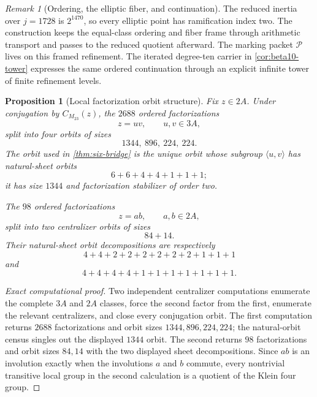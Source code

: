 \documentclass[11pt]{article}
\newtheorem{proposition}[theorem]{Proposition}
\theoremstyle{remark}
\newtheorem{remark}[theorem]{Remark}
\begin{document}
\begin{remark}[Ordering, the elliptic fiber, and continuation]\label{rem:1728-ordering-role}
The reduced inertia over $j=1728$ is $2^{1470}$, so every elliptic point has ramification index two.  The construction keeps the equal-class ordering and fiber frame through arithmetic transport and passes to the reduced quotient afterward.  The marking packet $\mathcal P$ lives on this framed refinement.  The iterated degree-ten carrier in \cref{cor:beta10-tower} expresses the same ordered continuation through an explicit infinite tower of finite refinement levels.
\end{remark}

\begin{proposition}[Local factorization orbit structure]\label{prop:factorization-orbits}
Fix $z\in2A$.  Under conjugation by $C_{M_{23}}(z)$, the $2688$ ordered factorizations
\[
 z=uv,
 \qquad u,v\in3A,
\]
split into four orbits of sizes
\[
 \boxed{1344,\ 896,\ 224,\ 224.}
\]
The orbit used in \cref{thm:six-bridge} is the unique orbit whose subgroup $\langle u,v\rangle$ has natural-sheet orbits
\[
 6+6+4+4+1+1+1;
\]
it has size $1344$ and factorization stabilizer of order two.

The $98$ ordered factorizations
\[
 z=ab,
 \qquad a,b\in2A,
\]
split into two centralizer orbits of sizes
\[
 \boxed{84+14.}
\]
Their natural-sheet orbit decompositions are respectively
\[
 4+4+2+2+2+2+2+2+1+1+1
\]
and
\[
 4+4+4+4+1+1+1+1+1+1+1.
\]
\end{proposition}

\begin{proof}[Exact computational proof]
Two independent centralizer computations enumerate the complete $3A$ and $2A$ classes, force the second factor from the first, enumerate the relevant centralizers, and close every conjugation orbit.  The first computation returns $2688$ factorizations and orbit sizes $1344,896,224,224$; the natural-orbit census singles out the displayed $1344$ orbit.  The second returns $98$ factorizations and orbit sizes $84,14$ with the two displayed sheet decompositions.  Since $ab$ is an involution exactly when the involutions $a$ and $b$ commute, every nontrivial transitive local group in the second calculation is a quotient of the Klein four group.
\end{proof}
\end{document}
